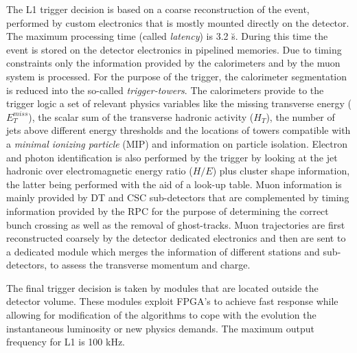 The L1 trigger decision is based on a coarse reconstruction of the event, performed by custom electronics that is mostly mounted directly on the detector. 
The maximum processing time (called \emph{latency}) is 3.2 \u s. 
During this time the event is stored on the detector electronics in pipelined memories. 
Due to timing constraints only the information provided by the calorimeters and by the muon system is processed. 
For the purpose of the trigger, the calorimeter segmentation is reduced into the so-called \emph{trigger-towers}. 
The calorimeters provide to the trigger logic a set of relevant physics variables like the missing transverse energy ($E_T^{miss}$), the scalar sum of the transverse hadronic activity ($H_T$), the number of jets above different energy thresholds and the locations of towers compatible with a \emph{minimal ionizing particle} (MIP) and information on particle isolation. 
Electron and photon identification is also performed by the trigger by looking at the jet hadronic over electromagnetic energy ratio ($H/E$) plus cluster shape information, the latter being performed with the aid of a look-up table. 
Muon information is mainly provided by DT and CSC sub-detectors that are complemented by timing information provided by the RPC for the purpose of determining the correct bunch crossing as well as the removal of ghost-tracks. 
Muon trajectories are first reconstructed coarsely by the detector dedicated electronics and then are sent to a dedicated module which merges the information of different stations and sub-detectors, to assess the transverse momentum  and charge. 

The final trigger decision is taken by modules that are located outside the detector volume. These modules exploit FPGA's to achieve fast response while allowing for modification of the algorithms to cope with the evolution the instantaneous luminosity or new physics demands. The maximum output frequency for L1 is 100 kHz.

